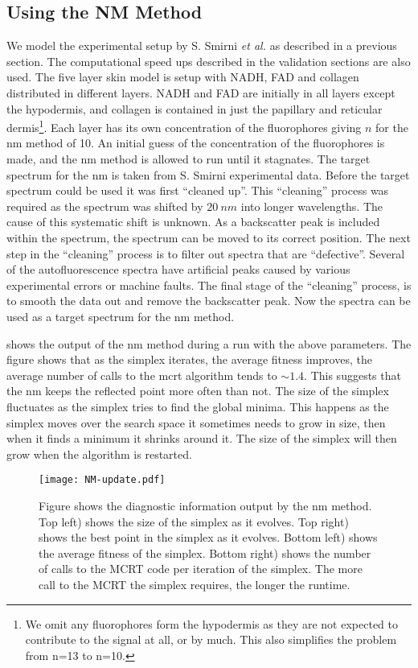 \FloatBarrier
\subsection{Using the NM Method}

We model the experimental setup by S. Smirni \textit{et al.} as described in a previous section.
The computational speed ups described in the validation sections are also used.
The five layer skin model is setup with NADH, FAD and collagen distributed in different layers.
NADH and FAD are initially in all layers except the hypodermis, and collagen is contained in just the papillary and reticular dermis\footnote{We omit any fluorophores form the hypodermis as they are not expected to contribute to the signal at all, or by much. This also simplifies the problem from n=13 to n=10.}.
Each layer has its own concentration of the fluorophores giving $n$ for the \gls*{nm} method of 10.
An initial guess of the concentration of the fluorophores is made, and the \gls*{nm} method is allowed to run until it stagnates.
The target spectrum for the \gls*{nm} is taken from S. Smirni experimental data.
Before the target spectrum could be used it was first ``cleaned up''.
This ``cleaning'' process was required as the spectrum was shifted by $20~nm$ into longer wavelengths.
The cause of this systematic shift is unknown.
As a backscatter peak is included within the spectrum, the spectrum can be moved to its correct position.
The next step in the ``cleaning'' process is to filter out spectra that are ``defective''.
Several of the autofluorescence spectra have artificial peaks caused by various experimental errors or machine faults.
The final stage of the ``cleaning'' process, is to smooth the data out and remove the backscatter peak. 
Now the spectra can be used as a target spectrum for the \gls*{nm} method.

 shows the output of the \gls*{nm} method during a run with the above parameters.
The figure shows that as the simplex iterates, the average fitness improves, the average number of calls to the \gls*{mcrt} algorithm tends to $\sim 1.4$.
This suggests that the \gls*{nm} keeps the reflected point more often than not.
The size of the simplex fluctuates as the simplex tries to find the global minima.
This happens as the simplex moves over the search space it sometimes needs to grow in size, then when it finds a minimum it shrinks around it.
The size of the simplex will then grow when the algorithm is restarted.

\begin{figure}[!htpb]
  \centering
  \texttt{[image: NM-update.pdf]}
  \caption{Figure shows the diagnostic information output by the \gls*{nm} method. Top left) shows the size of the simplex as it evolves. Top right) shows the best point in the simplex as it evolves. Bottom left) shows the average fitness of the simplex. Bottom right) shows the number of calls to the MCRT code per iteration of the simplex. The more call to the MCRT the simplex requires, the longer the runtime.}
  \label{fig:NMupdate}
\end{figure}


